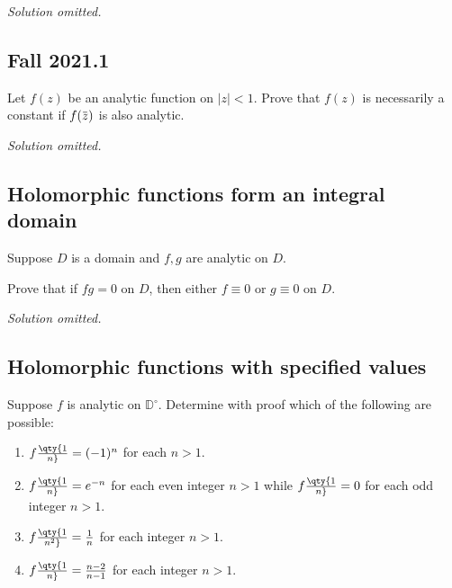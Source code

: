 \emph{Solution omitted.}

\hypertarget{fall-2021.1}{%
\subsection{Fall 2021.1}\label{fall-2021.1}}

\begin{problem}[?]

Let \(f(z)\) be an analytic function on \(|z|<1\). Prove that \(f(z)\)
is necessarily a constant if
\(f(\mkern 1.5mu\overline{\mkern-1.5muz\mkern-1.5mu}\mkern 1.5mu)\) is
also analytic.

\end{problem}

\emph{Solution omitted.}

\hypertarget{holomorphic-functions-form-an-integral-domain}{%
\subsection{Holomorphic functions form an integral
domain}\label{holomorphic-functions-form-an-integral-domain}}

\begin{problem}[?]

Suppose \(D\) is a domain and \(f, g\) are analytic on \(D\).

Prove that if \(fg = 0\) on \(D\), then either \(f \equiv 0\) or
\(g\equiv 0\) on \(D\).

\end{problem}

\emph{Solution omitted.}

\hypertarget{holomorphic-functions-with-specified-values}{%
\subsection{Holomorphic functions with specified
values}\label{holomorphic-functions-with-specified-values}}

\begin{problem}[?]

Suppose \(f\) is analytic on \({\mathbb{D}}^\circ\). Determine with
proof which of the following are possible:

\begin{enumerate}
\def\labelenumi{\alph{enumi}.}
\item
  \(f\qty{1\over n} = (-1)^n\) for each \(n>1\).
\item
  \(f\qty{1\over n} = e^{-n}\) for each even integer \(n>1\) while
  \(f\qty{1\over n} = 0\) for each odd integer \(n>1\).
\item
  \(f\qty{1\over n^2} = {1\over n}\) for each integer \(n>1\).
\item
  \(f\qty{1\over n} = {n-2 \over n-1}\) for each integer \(n>1\).
\end{enumerate}

\end{problem}


